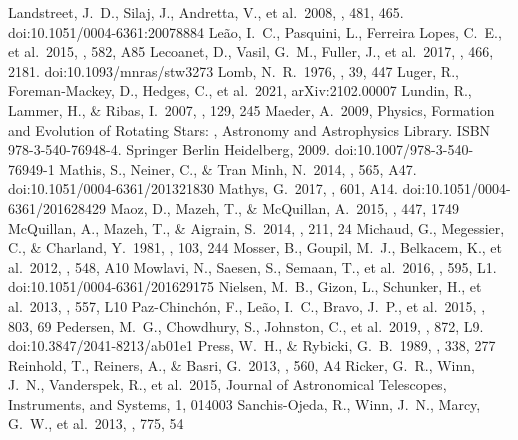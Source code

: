 \documentclass[RNAAS]{aastex63}
\begin{document}
\begin{thebibliography}{}
 Landstreet, J.~D., Silaj, J., Andretta, V., et al.\ 2008, \aap, 481, 465. doi:10.1051/0004-6361:20078884
 Le{\~a}o, I.~C., Pasquini, L., Ferreira Lopes, C.~E., et al.\ 2015, \aap, 582, A85
 Lecoanet, D., Vasil, G.~M., Fuller, J., et al.\ 2017, \mnras, 466, 2181. doi:10.1093/mnras/stw3273
 Lomb, N.~R.\ 1976, \apss, 39, 447
 Luger, R., Foreman-Mackey, D., Hedges, C., et al.\ 2021, arXiv:2102.00007
 Lundin, R., Lammer, H., \& Ribas, I.\ 2007, \ssr, 129, 245
 Maeder, A.\ 2009, Physics, Formation and Evolution of Rotating Stars: , Astronomy and Astrophysics Library. ISBN 978-3-540-76948-4. Springer Berlin Heidelberg, 2009. doi:10.1007/978-3-540-76949-1
 Mathis, S., Neiner, C., \& Tran Minh, N.\ 2014, \aap, 565, A47. doi:10.1051/0004-6361/201321830
 Mathys, G.\ 2017, \aap, 601, A14. doi:10.1051/0004-6361/201628429
 Maoz, D., Mazeh, T., \& McQuillan, A.\ 2015, \mnras, 447, 1749
 McQuillan, A., Mazeh, T., \& Aigrain, S.\ 2014, \apjs, 211, 24
 Michaud, G., Megessier, C., \& Charland, Y.\ 1981, \aap, 103, 244
 Mosser, B., Goupil, M.~J., Belkacem, K., et al.\ 2012, \aap, 548, A10
 Mowlavi, N., Saesen, S., Semaan, T., et al.\ 2016, \aap, 595, L1. doi:10.1051/0004-6361/201629175
 Nielsen, M.~B., Gizon, L., Schunker, H., et al.\ 2013, \aap, 557, L10
 Paz-Chinch{\'o}n, F., Le{\~a}o, I.~C., Bravo, J.~P., et al.\ 2015, \apj, 803, 69
 Pedersen, M.~G., Chowdhury, S., Johnston, C., et al.\ 2019, \apjl, 872, L9. doi:10.3847/2041-8213/ab01e1
 Press, W.~H., \& Rybicki, G.~B.\ 1989, \apj, 338, 277
 Reinhold, T., Reiners, A., \& Basri, G.\ 2013, \aap, 560, A4
 Ricker, G.~R., Winn, J.~N., Vanderspek, R., et al.\ 2015, Journal of Astronomical Telescopes, Instruments, and Systems, 1, 014003
 Sanchis-Ojeda, R., Winn, J.~N., Marcy, G.~W., et al.\ 2013, \apj, 775, 54

\end{thebibliography}
\end{document}
